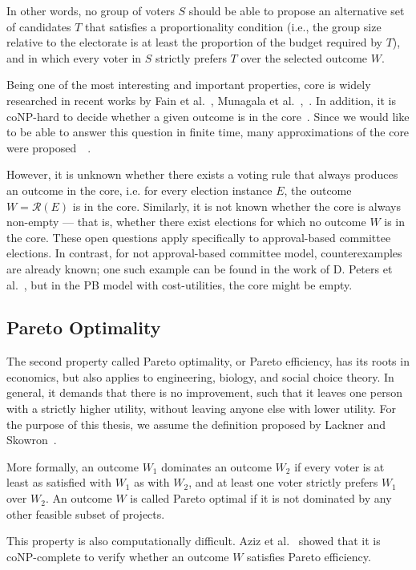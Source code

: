 \documentclass[magisterska,en]{pracamgr}
\begin{document}
In other words, no group of voters $S$ should be able to propose an alternative set of candidates $T$ that satisfies a proportionality condition (i.e., the group size relative to the electorate is at least the proportion of the budget required by $T$), and in which every voter in $S$ strictly prefers $T$ over the selected outcome $W$.

Being one of the most interesting and important properties, core is widely researched in recent works by Fain et al.~\cite{4}, Munagala et al.~\cite{13},~\cite{14}. In addition, it is coNP-hard to decide whether a given outcome is in the core~\cite{15}. Since we would like to be able to answer this question in finite time, many approximations of the core were proposed~\cite{13}~\cite{16}.

However, it is unknown whether there exists a voting rule that always produces an outcome in the core, i.e. for every election instance $E$, the outcome $W=\mathcal{R}(E)$ is in the core. Similarly, it is not known whether the core is always non-empty --- that is, whether there exist elections for which no outcome $W$ is in the core. These open questions apply specifically to approval-based committee elections. In contrast, for not approval-based committee model, counterexamples are already known; one such example can be found in the work of D. Peters et al.~\cite{17}, but in the PB model with cost-utilities, the core might be empty.

\subsection{Pareto Optimality}

The second property called Pareto optimality, or Pareto efficiency, has its roots in economics, but also applies to engineering, biology, and social choice theory. In general, it demands that there is no improvement, such that it leaves one person with a strictly higher utility, without leaving anyone else with lower utility. For the purpose of this thesis, we assume the definition proposed by Lackner and Skowron~\cite{18}.

More formally, an outcome $W_1$ dominates an outcome $W_2$ if every voter is at least as satisfied with $W_1$ as with $W_2$, and at least one voter strictly prefers $W_1$ over $W_2$. An outcome $W$ is called Pareto optimal if it is not dominated by any other feasible subset of projects.

This property is also computationally difficult. Aziz et al.~\cite{5} showed that it is coNP-complete to verify whether an outcome $W$ satisfies Pareto efficiency.
\end{document}
